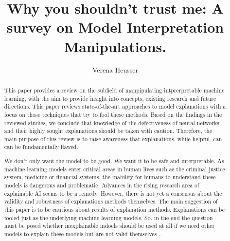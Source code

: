 \documentclass[sigconf]{acmart}
\begin{document}
\title{Why you shouldn't trust me: A survey on Model Interpretation Manipulations.}

\author{Verena Heusser}


\begin{abstract}

  This paper provides a review on the subfield of manpipulating intprerpretable machine learning, with the aim to provide insight into concepts, existing research and future directions.  
  This paper reviews state-of-the-art approaches to model explanations with a focus on those techniques that try to 
  fool these methods. Based on the findings in the reviewed studies, we conclude that knowledge of the defectiveness of neural networks and their highly sought explanations should be taken with caution. Therefore, the main purpose of this review is to raise awareness that explanations, while helpful, can can be fundamentally flawed.

  We don't only want the model to be good. We want it to be safe and interpretable. 
  As machine learning models enter critical areas in human lives such as the criminal justice system, medicine or financial systems, the inability for humans to understand these models is dangerous and problematic. Advances in the rising research area of explainable AI seems to be a remedy. However, there is not yet a consensus about the validity and robustness of explanations methods themselves. The main suggestion of this paper is to be cautious about results of explanation methods. Explanations can be fooled just as the underlying machine learning models. So. in the end the question must be posed whether inexplainable mdoels should be used at all if we need other models to explain these models but are not valid themselves .. %



\end{abstract}
\end{document}
